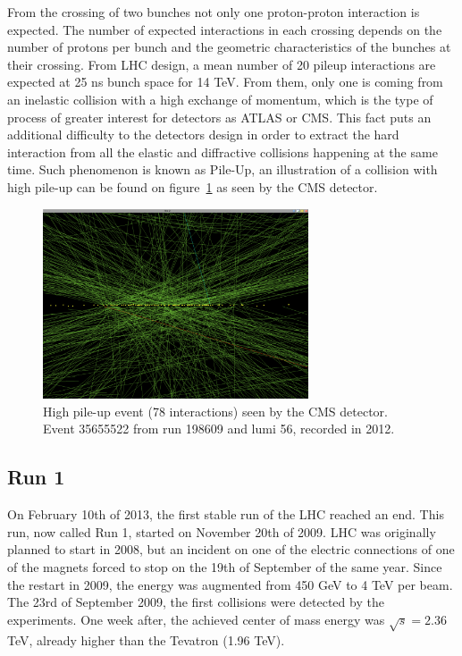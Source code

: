 From the crossing of two bunches not only one proton-proton interaction is expected. The number of expected interactions in each crossing depends on the number of protons per bunch and the geometric characteristics of the bunches at their crossing. From LHC design, a mean number of 20 pileup interactions are expected at 25 ns bunch space for 14 TeV. From them, only one is coming from an inelastic collision with a high exchange of momentum, which is the type of process of greater interest for detectors as ATLAS or CMS. This fact puts an additional difficulty to the detectors design in order to extract the hard interaction from all the elastic and diffractive collisions happening at the same time. Such phenomenon is known as Pile-Up, an illustration of a collision with high pile-up can be found on figure~\ref{fig:pileup} as seen by the CMS detector.

\begin{figure}[!Hhtbp]
  \begin{center}
    \includegraphics[width=0.7\textwidth]{figs/pileup.png}
    \caption{High pile-up event (78 interactions) seen by the CMS detector. Event 35655522 from run 198609 and lumi 56, recorded in 2012.}%
    \label{fig:pileup}
  \end{center}
\end{figure}

\subsection{Run 1}
\label{sec:run1}

On February 10th of 2013, the first stable run of the LHC reached an end. This run, now called Run 1, started on November 20th of 2009. LHC was originally planned to start in 2008, but an incident on one of the electric connections of one of the magnets forced to stop on the 19th of September of the same year. Since the restart in 2009, the energy was augmented from 450 GeV to 4 TeV per beam. The 23rd of September 2009, the first collisions were detected by the experiments. One week after, the achieved center of mass energy was $\sqrt{s}=2.36$ TeV, already higher than the Tevatron (1.96 TeV).


